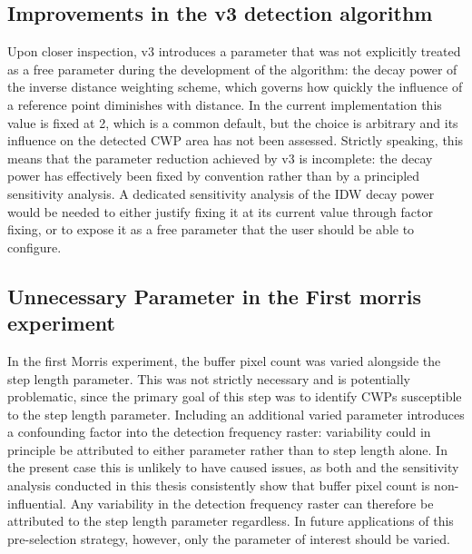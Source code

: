 \subsection{Improvements in the v3 detection algorithm}

Upon closer inspection, v3 introduces a parameter that was not explicitly 
treated as a free parameter during the development of the algorithm: the decay 
power of the inverse distance weighting scheme, which governs how quickly the 
influence of a reference point diminishes with distance. In the current 
implementation this value is fixed at 2, which is a common default, but the 
choice is arbitrary and its influence on the detected CWP area has not been 
assessed. Strictly speaking, this means that the parameter reduction achieved 
by v3 is incomplete: the decay power has effectively been fixed by convention 
rather than by a principled sensitivity analysis. A dedicated sensitivity 
analysis of the IDW decay power would be needed to either justify fixing it at 
its current value through factor fixing, or to expose it as a free parameter 
that the user should be able to configure.

\subsection{Unnecessary Parameter in the First morris experiment}


In the first Morris experiment, the buffer pixel count was varied alongside 
the step length parameter. This was not strictly necessary and is potentially 
problematic, since the primary goal of this step was to identify CWPs 
susceptible to the step length parameter. Including an additional varied 
parameter introduces a confounding factor into the detection frequency raster: 
variability could in principle be attributed to either parameter rather than 
to step length alone. In the present case this is unlikely to have caused 
issues, as both \citet{tonolla_thermische-kartographie_2026} and the sensitivity 
analysis conducted in this thesis consistently show that buffer pixel count is 
non-influential. Any variability in the detection frequency raster can 
therefore be attributed to the step length parameter regardless. In future 
applications of this pre-selection strategy, however, only the parameter of 
interest should be varied.
